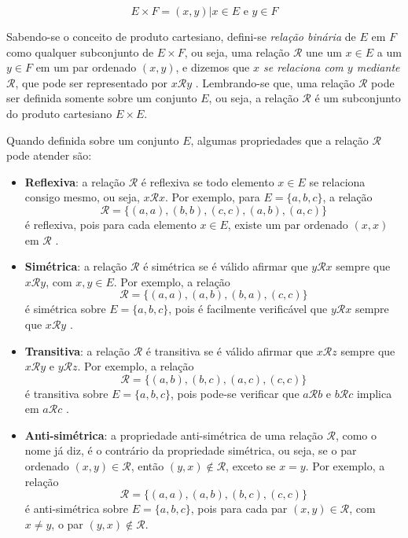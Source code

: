 \begin{equation}
  E \times F = {(x, y) | x \in E \mbox{ e } y \in F}
\end{equation}

Sabendo-se o conceito de produto cartesiano, defini-se \textit{relação binária} de \(E\) em \(F\) como qualquer subconjunto de \(E \times F\), ou seja, uma relação \(\mathcal{R}\) une um \(x \in E\) a um \(y \in F\) em um par ordenado \((x, y)\), e dizemos que \textit{\(x\) se relaciona com \(y\) mediante \(\mathcal{R}\)}, que pode ser representado por \(x\mathcal{R}y\) \cite{Domingues:2003}. Lembrando-se que, uma relação \(\mathcal{R}\) pode ser definida somente sobre um conjunto \(E\), ou seja, a relação \(\mathcal{R}\) é um subconjunto do produto cartesiano \(E \times E\).

Quando definida sobre um conjunto \(E\), algumas propriedades que a relação \(\mathcal{R}\) pode atender são:

\begin{itemize}
  \item \textbf{Reflexiva}: a relação \(\mathcal{R}\) é reflexiva se todo elemento \(x \in E\) se relaciona consigo mesmo, ou seja, \(x\mathcal{R}x\). Por exemplo, para \(E = \{a, b, c\}\), a relação 
  $$\mathcal{R} = \{(a, a), (b, b), (c, c), (a, b), (a, c)\}$$
  é reflexiva, pois para cada elemento \(x \in E\), existe um par ordenado \((x, x)\) em \(\mathcal{R}\) \cite{Domingues:2003}. 

  \item \textbf{Simétrica}: a relação \(\mathcal{R}\) é simétrica se é válido afirmar que \(y\mathcal{R}x\) sempre que \(x\mathcal{R}y\), com \(x, y \in E\). Por exemplo, a relação 
  $$\mathcal{R} = \{(a, a), (a, b), (b, a), (c, c)\}$$
  é simétrica sobre \(E = \{a, b, c\}\), pois é facilmente verificável que \(y\mathcal{R}x\) sempre que \(x\mathcal{R}y\) \cite{Domingues:2003}.

  \item \textbf{Transitiva}: a relação \(\mathcal{R}\) é transitiva se é válido afirmar que \(x\mathcal{R}z\) sempre que \(x\mathcal{R}y\) e \(y\mathcal{R}z\). Por exemplo, a relação 
  $$\mathcal{R} = \{(a, b), (b, c), (a, c), (c, c)\}$$
  é transitiva sobre \(E = \{a, b, c\}\), pois pode-se verificar que \(a\mathcal{R}b\) e \(b\mathcal{R}c\) implica em \(a\mathcal{R}c\) \cite{Domingues:2003}.

  \item \textbf{Anti-simétrica}: a propriedade anti-simétrica de uma relação \(\mathcal{R}\), como o nome já diz, é o contrário da propriedade simétrica, ou seja, se o par ordenado \((x, y) \in \mathcal{R}\), então \((y, x) \notin \mathcal{R}\), exceto se \(x = y\). Por exemplo, a relação 
  $$\mathcal{R} = \{(a, a), (a, b), (b, c), (c, c)\}$$
  é anti-simétrica sobre \(E = \{a, b, c\}\), pois para cada par \((x, y) \in \mathcal{R}\), com \(x \neq y\), o par \((y, x) \notin \mathcal{R}\).
\end{itemize}

